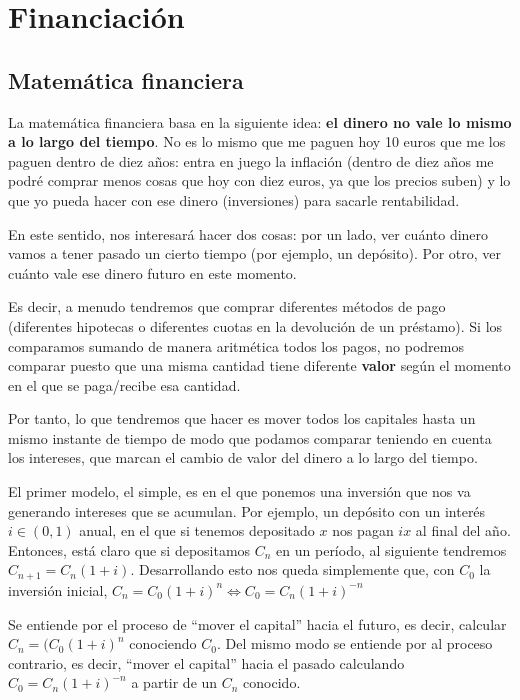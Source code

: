 \documentclass[nochap,palatino,shortheader]{apuntes}
\begin{document}
\section{Financiación}

\subsection{Matemática financiera}

La matemática financiera basa en la siguiente idea: \textbf{el dinero no vale lo mismo a lo largo del tiempo}. No es lo mismo que me paguen hoy 10 euros que me los paguen dentro de diez años: entra en juego la inflación (dentro de diez años me podré comprar menos cosas que hoy con diez euros, ya que los precios suben) y lo que yo pueda hacer con ese dinero (inversiones) para sacarle rentabilidad.

En este sentido, nos interesará hacer dos cosas: por un lado, ver cuánto dinero vamos a tener pasado un cierto tiempo (por ejemplo, un depósito). Por otro, ver cuánto vale ese dinero futuro en este momento.

Es decir, a menudo tendremos que comprar diferentes métodos de pago (diferentes hipotecas o diferentes cuotas en la devolución de un préstamo). Si los comparamos sumando de manera aritmética todos los pagos, no podremos comparar puesto que una misma cantidad tiene diferente \textbf{valor} según el momento en el que se paga/recibe esa cantidad.

Por tanto, lo que tendremos que hacer es mover todos los capitales hasta un mismo instante de tiempo de modo que podamos comparar teniendo en cuenta los intereses, que marcan el cambio de valor del dinero a lo largo del tiempo.

El primer modelo, el simple, es en el que ponemos una inversión que nos va generando intereses que se acumulan. Por ejemplo, un depósito con un interés $i ∈ (0,1)$ anual, en el que si tenemos depositado $x$ nos pagan $ix$ al final del año. Entonces, está claro que si depositamos $C_n$ en un período, al siguiente tendremos $C_{n+1} = C_n(1+i)$. Desarrollando esto nos queda simplemente que, con $C_0$ la inversión inicial, \( C_n = C_0 (1+i)^n \iff C_0 = C_n (1+i)^{-n} \label{eq:InteresCapFijo} \)

Se entiende por  el proceso de ``mover el capital'' hacia el futuro, es decir, calcular $C_n=(C_0(1+i)^n$ conociendo $C_0$. Del mismo modo se entiende por  al proceso contrario, es decir, ``mover el capital'' hacia el pasado calculando $C_0=C_n(1+i)^{-n}$ a partir de un $C_n$ conocido.
\end{document}
